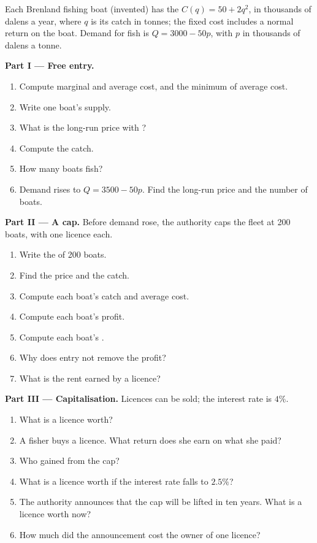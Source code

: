 \begin{problem}\label{pb:b1:competitive-industry:fishing}
Each Brenland fishing boat (invented) has the 
$C(q) = 50 + 2q^2$, in thousands of dalens a year, where $q$ is its catch in
tonnes; the fixed cost includes a normal return on the boat. Demand for
fish is $Q = 3000 - 50p$, with $p$ in thousands of dalens a tonne.

\medskip\noindent\textbf{Part I --- Free entry.}
\begin{enumerate}
  \item Compute marginal and average cost, and the minimum of average cost.
  \item Write one boat's supply.
  \item What is the long-run price with ?
  \item Compute the catch.
  \item How many boats fish?
  \item Demand rises to $Q = 3500 - 50p$. Find the long-run price and the number of boats.
\end{enumerate}

\medskip\noindent\textbf{Part II --- A cap.} Before demand rose, the authority
caps the fleet at 200 boats, with one licence each.
\begin{enumerate}[resume]
  \item Write the  of 200 boats.
  \item Find the price and the catch.
  \item Compute each boat's catch and average cost.
  \item Compute each boat's profit.
  \item Compute each boat's .
  \item Why does entry not remove the profit?
  \item What is the rent earned by a licence?
\end{enumerate}

\medskip\noindent\textbf{Part III --- Capitalisation.} Licences can be sold;
the interest rate is $4\%$.
\begin{enumerate}[resume]
  \item What is a licence worth?
  \item A fisher buys a licence. What return does she earn on what she paid?
  \item Who gained from the cap?
  \item What is a licence worth if the interest rate falls to $2.5\%$?
  \item The authority announces that the cap will be lifted in ten years. What is a licence worth now?
  \item How much did the announcement cost the owner of one licence?
\end{enumerate}


\end{problem}
